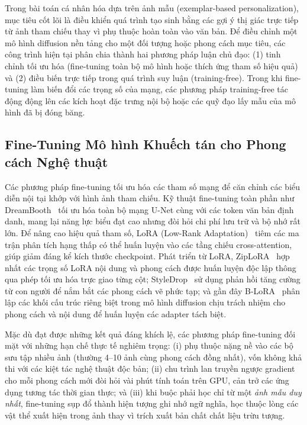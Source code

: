 \documentclass[runningheads]{llncs}
\begin{document}
Trong bài toán cá nhân hóa dựa trên ảnh mẫu (exemplar-based personalization), mục tiêu cốt lõi là điều khiển quá trình tạo sinh bằng các gợi ý thị giác trực tiếp từ ảnh tham chiếu thay vì phụ thuộc hoàn toàn vào văn bản. Để điều chỉnh một mô hình diffusion nền tảng cho một đối tượng hoặc phong cách mục tiêu, các công trình hiện tại phân chia thành hai phương pháp luận chủ đạo: (1) tinh chỉnh tối ưu hóa (fine-tuning toàn bộ mô hình hoặc thích ứng tham số hiệu quả) và (2) điều biến trực tiếp trong quá trình suy luận (training-free). Trong khi fine-tuning làm biến đổi các trọng số của mạng, các phương pháp training-free tác động động lên các kích hoạt đặc trưng nội bộ hoặc các quỹ đạo lấy mẫu của mô hình đã bị đóng băng.

\subsection{Fine-Tuning Mô hình Khuếch tán cho Phong cách Nghệ thuật}
Các phương pháp fine-tuning tối ưu hóa các tham số mạng để căn chỉnh các biểu diễn nội tại khớp với hình ảnh tham chiếu. Kỹ thuật fine-tuning toàn phần như DreamBooth~\cite{dreambooth} tối ưu hóa toàn bộ mạng U-Net cùng với các token văn bản định danh, mang lại năng lực biểu đạt cao nhưng đòi hỏi chi phí lưu trữ và bộ nhớ rất lớn. Để nâng cao hiệu quả tham số, LoRA (Low-Rank Adaptation)~\cite{lora} tiêm các ma trận phân tích hạng thấp có thể huấn luyện vào các tầng chiếu cross-attention, giúp giảm đáng kể kích thước checkpoint. Phát triển từ LoRA, ZipLoRA~\cite{ziplora} hợp nhất các trọng số LoRA nội dung và phong cách được huấn luyện độc lập thông qua phép tối ưu hóa trực giao từng cột; StyleDrop~\cite{styledrop} sử dụng phản hồi tăng cường từ con người để nắm bắt các phong cách vẽ phức tạp; và gần đây B-LoRA~\cite{b-lora} phân lập các khối cấu trúc riêng biệt trong mô hình diffusion chịu trách nhiệm cho phong cách và nội dung để huấn luyện các adapter tách biệt.

Mặc dù đạt được những kết quả đáng khích lệ, các phương pháp fine-tuning đối mặt với những hạn chế thực tế nghiêm trọng: (i) phụ thuộc nặng nề vào các bộ sưu tập nhiều ảnh (thường 4--10 ảnh cùng phong cách đồng nhất), vốn không khả thi với các kiệt tác nghệ thuật độc bản; (ii) chu trình lan truyền ngược gradient cho mỗi phong cách mới đòi hỏi vài phút tính toán trên GPU, cản trở các ứng dụng tương tác thời gian thực; và (iii) khi buộc phải học chỉ từ một \textit{ảnh mẫu duy nhất}, fine-tuning sụp đổ thành hiện tượng ghi nhớ ngữ nghĩa, học thuộc lòng các vật thể xuất hiện trong ảnh thay vì trích xuất bản chất chất liệu trừu tượng.
\end{document}
